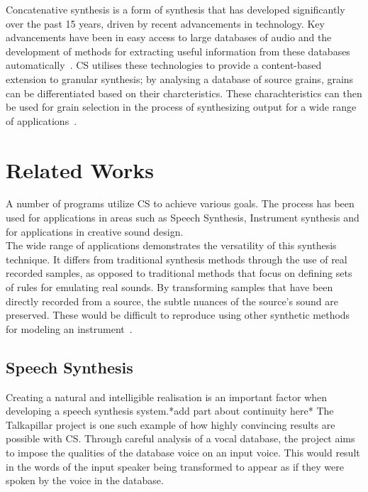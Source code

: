 \documentclass{scrartcl}
\begin{document}
    Concatenative synthesis is a form of synthesis that has developed
    significantly over the past 15 years, driven by recent advancements in
    technology. Key advancements have been in easy access to large databases of
    audio and the development of methods for extracting useful information from
    these databases automatically~\parencite[p.1]{Schwarz2006}.  CS utilises
    these technologies to provide a content-based extension to granular
    synthesis; by analysing a database of source grains, grains can be
    differentiated based on their charcteristics.  These charachteristics can
    then be used for grain selection in the process of synthesizing output for
    a wide range of applications~\parencite[p.102]{Schwarz2007}.

    \section*{Related Works}
    A number of programs utilize CS to achieve various goals. The process has
    been used for applications in areas such as Speech Synthesis, Instrument
    synthesis and for applications in creative sound design.\\
    The wide range of applications demonstrates the versatility of this
    synthesis technique. It differs from traditional synthesis methods through
    the use of real recorded samples, as opposed to traditional methods that
    focus on defining sets of rules for emulating real sounds. By transforming
    samples that have been directly recorded from a source, the subtle nuances
    of the source's sound are preserved. These would be difficult to reproduce
    using other synthetic methods for modeling an
    instrument~\parencite[p.24]{Maestre2009a}.

    \subsection*{Speech Synthesis}
    Creating a natural and intelligible realisation is an important factor when
    developing a speech synthesis system.*add part about continuity here* The
    Talkapillar project is one such example of how highly convincing results
    are possible with CS. Through careful analysis of a vocal database, the
    project aims to impose the qualities of the database voice on an input
    voice. This would result in the words of the input speaker being
    transformed to appear as if they were spoken by the voice in the
    database.~\parencite{Hueber}
    
\end{document}
